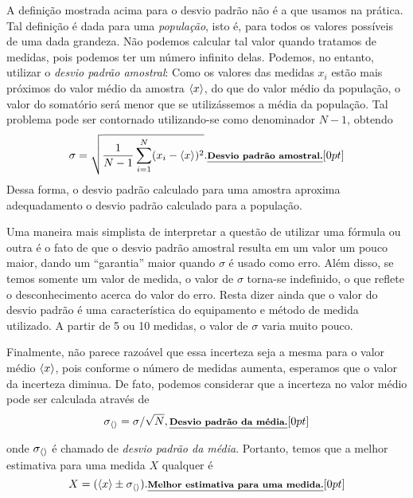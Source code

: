 A definição mostrada acima para o desvio padrão não é a que usamos na prática. Tal definição é dada para uma \emph{população}, isto é, para todos os valores possíveis de uma dada grandeza. Não podemos calcular tal valor quando tratamos de medidas, pois podemos ter um número infinito delas. Podemos, no entanto, utilizar o \emph{desvio padrão amostral}: Como os valores das medidas $x_i$ estão mais próximos do valor médio da amostra $\left\langle{x}\right\rangle$, do que do valor médio da população, o valor do somatório será menor que se utilizássemos a média da população. Tal problema pode ser contornado utilizando-se como denominador $N - 1$, obtendo
\begin{equation}\label{Eq:DesvioPadraoN-1}
	\sigma = \sqrt{\frac{1}{N-1} \sum_{i=1}^N (x_i - \left\langle{x}\right\rangle)^2}. \relax{\footnotesize\emph{\textbf{Desvio padrão amostral.}}}[0pt]
\end{equation}
%
Dessa forma, o desvio padrão calculado para uma amostra aproxima adequadamento o desvio padrão calculado para a população.

Uma maneira mais simplista de interpretar a questão de utilizar uma fórmula ou outra é o fato de que o desvio padrão amostral resulta em um valor um pouco maior, dando um ``garantia'' maior quando $\sigma$ é usado como erro. Além disso, se temos somente um valor de medida, o valor de $\sigma$ torna-se indefinido, o que reflete o desconhecimento acerca do valor do erro. Resta dizer ainda que o valor do desvio padrão é uma característica do equipamento e método de medida utilizado. A partir de 5 ou 10 medidas, o valor de $\sigma$ varia muito pouco. 

Finalmente, não parece razoável que essa incerteza seja a mesma para o valor médio $\left\langle{x}\right\rangle$, pois conforme o número de medidas aumenta, esperamos que o valor da incerteza diminua. De fato, podemos considerar que a incerteza no valor médio pode ser calculada através de
\begin{equation}
	\sigma_{\left\langle{}\right\rangle} = \sigma / \sqrt{N}, \relax{\footnotesize\emph{\textbf{Desvio padrão da média.}}}[0pt]
\end{equation}

\noindent{}onde $\sigma_{\left\langle{}\right\rangle}$ é chamado de \emph{desvio padrão da média}. Portanto, temos que a melhor estimativa para uma medida $X$ qualquer é
\begin{equation}
	X = (\left\langle{x}\right\rangle \pm \sigma_{\left\langle{}\right\rangle}). \relax{\footnotesize\emph{\textbf{Melhor estimativa para uma medida.}}}[0pt]
\end{equation}
